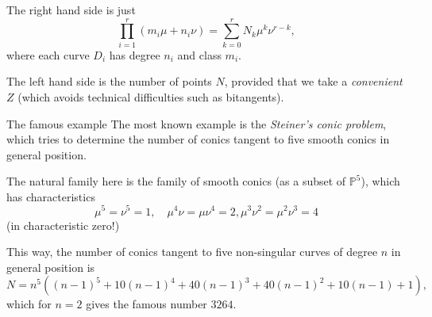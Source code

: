 \documentclass{beamer}
\renewcommand{\P}{\mathbb{P}}
\begin{document}
\begin{frame}
The right hand side is just
\[ \prod_{i=1}^r (m_i \mu + n_i \nu) = \sum_{k=0}^r N_k \mu^k \nu^{r-k}, \]
where each curve $D_i$ has degree $n_i$ and class $m_i$. 

The left hand side is the number of points $N$, provided that we take a \emph{convenient} $Z$ (which avoids technical difficulties such as bitangents). 
\end{frame}



\begin{frame}{The famous example}
The most known example is the \emph{Steiner's conic problem}, which tries to determine the number of conics tangent to five smooth conics in general position. \pause

The natural family here is the family of smooth conics (as a subset of $\P^5$), which has characteristics
\[ \mu^5=\nu^5=1, \quad \mu^4\nu=\mu\nu^4=2, \mu^3\nu^2=\mu^2\nu^3=4 \]
(in characteristic zero!)

This way, the number of conics tangent to five non-singular curves of degree $n$ in general position is
\[ N=n^5((n-1)^5+10(n-1)^4+40(n-1)^3+40(n-1)^2+10(n-1)+1), \]
which for $n=2$ gives the famous number $3264$. 
\end{frame}
\end{document}
